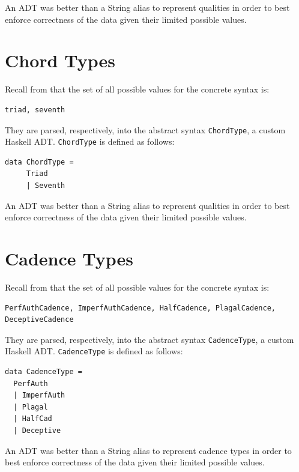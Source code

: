 \documentclass{report}
\newcommand\param[1]{\textttu{<#1>}}
\begin{document}
An ADT was better than a String alias to represent qualities in order to best enforce correctness of the data given their limited possible values. 
\section{Chord Types}

Recall from   that the set of all possible values for the concrete syntax \param{CHORDTYPE} is:
\begin{verbatim}
triad, seventh
\end{verbatim}

They are parsed, respectively, into the abstract syntax \verb.ChordType., a custom Haskell ADT. \verb.ChordType. is defined as follows:

\begin{verbatim}
data ChordType = 
     Triad 
     | Seventh
\end{verbatim}

An ADT was better than a String alias to represent qualities in order to best enforce correctness of the data given their limited possible values. 

\section{Cadence Types}

Recall from   that the set of all possible values for the concrete syntax \param{CADENCETYPE} is:
\begin{verbatim}
PerfAuthCadence, ImperfAuthCadence, HalfCadence, PlagalCadence, DeceptiveCadence
\end{verbatim}

They are parsed, respectively, into the abstract syntax \verb.CadenceType., a custom Haskell ADT. \verb.CadenceType. is defined as follows:

\begin{verbatim}
data CadenceType = 
  PerfAuth 
  | ImperfAuth
  | Plagal
  | HalfCad
  | Deceptive
\end{verbatim}

An ADT was better than a String alias to represent cadence types in order to best enforce correctness of the data given their limited possible values. 
\end{document}
